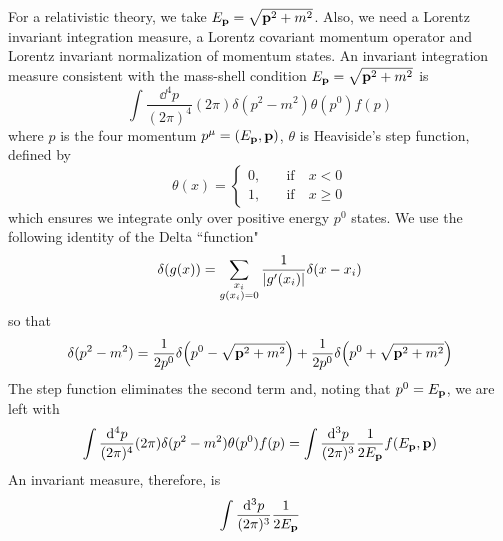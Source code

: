 For a relativistic theory, we take $E_{\vb{p}}=\sqrt{\vb{p}^2+m^2}$.  Also,
 we need a Lorentz invariant integration measure, a Lorentz covariant momentum operator and Lorentz invariant  normalization of momentum states. An invariant integration measure consistent with the mass-shell condition $E_{\vb{p}}=\sqrt{\vb{p}^2+m^2}$ is
\begin{equation}
    \int\frac{\dd^4p}{(2\pi)^4}(2\pi)\delta(p^2-m^2)\theta(p^0)f(p)
\end{equation}
where $p$ is the four momentum $p^\mu=(E_{\vb{p}},\vb{p})$, $\theta$ is Heaviside's step function, defined by
\begin{equation}
    \theta(x)=
\begin{cases}
    0,&\quad\text{if}\quad x<0\\
    1,  &\quad\text{if}\quad x\geq0
\end{cases}
\end{equation}
which ensures we integrate only over positive energy $p^0$ states.
We use the following identity of the Delta ``function"
\begin{equation}
    \delta(g(x))=\sum_{\substack{x_i\\{g(x_i)=0}}}\frac{1}{\abs{g^\prime(x_i)}}\delta(x-x_i)
\end{equation}
so that
\begin{equation}
    \delta(p^2-m^2)=\frac{1}{2p^0}\delta\qty(p^0-\sqrt{\vb{p}^2+m^2})+\frac{1}{2p^0}\delta\qty(p^0+\sqrt{\vb{p}^2+m^2})
\end{equation}
The step function eliminates the second term and,  noting that $p^0=E_{\vb{p}}$, we are left with
\begin{equation}
         \int\frac{\dd^4p}{(2\pi)^4}(2\pi)\delta(p^2-m^2)\theta(p^0)f(p)=\int\frac{\dd^3p}{(2\pi)^3}\frac{1}{2E_{\vb{p}}}f(E_{\vb{p}},\vb{p})
\end{equation}
An invariant measure, therefore, is
\begin{equation}
    \int\frac{\dd^3p}{(2\pi)^3}\frac{1}{2E_{\vb{p}}}
\end{equation}

